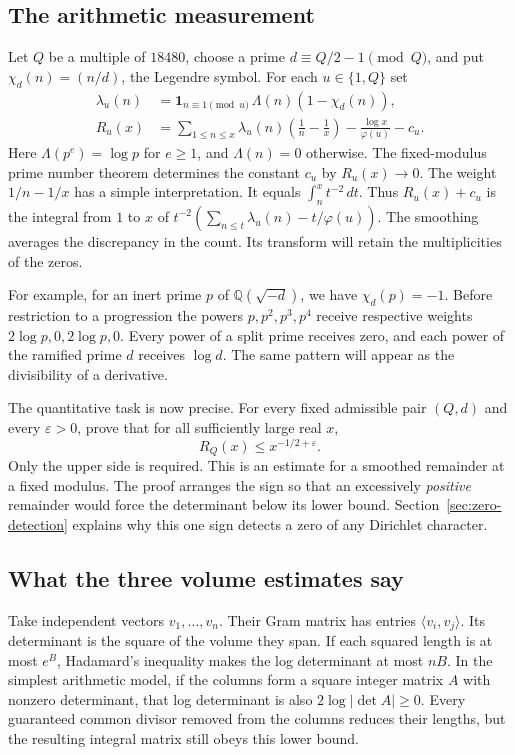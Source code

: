 \documentclass[11pt,letterpaper]{article}
\begin{document}
\subsection{The arithmetic measurement}
Let \(Q\) be a multiple of \(18480\), choose a prime \(d\equiv Q/2-1\pmod Q\), and put \(\chi_d(n)=(n/d)\), the Legendre symbol. For each \(u\in\{1,Q\}\) set
\begin{align}
 \lambda_u(n)&=\mathbf1_{n\equiv1\pmod u}\,\Lambda(n)(1-\chi_d(n)),\nonumber\\
 R_u(x)&=\sum_{1\le n\le x}\lambda_u(n)\left(\frac1n-\frac1x\right)
               -\frac{\log x}{\varphi(u)}-c_u. \label{eq:remainder}
\end{align}
Here \(\Lambda(p^e)=\log p\) for \(e\ge1\), and \(\Lambda(n)=0\) otherwise. The fixed-modulus prime number theorem determines the constant \(c_u\) by \(R_u(x)\to0\). The weight \(1/n-1/x\) has a simple interpretation. It equals \(\int_n^x t^{-2}\,dt\). Thus \(R_u(x)+c_u\) is the integral from \(1\) to \(x\) of
\(t^{-2}(\sum_{n\le t}\lambda_u(n)-t/\varphi(u))\). The smoothing averages the discrepancy in the count. Its transform will retain the multiplicities of the zeros.

For example, for an inert prime \(p\) of \(\mathbb Q(\sqrt{-d})\), we have \(\chi_d(p)=-1\). Before restriction to a progression the powers \(p,p^2,p^3,p^4\) receive respective weights \(2\log p,0,2\log p,0\). Every power of a split prime receives zero, and each power of the ramified prime \(d\) receives \(\log d\). The same pattern will appear as the divisibility of a derivative.

The quantitative task is now precise. For every fixed admissible pair \((Q,d)\) and every \(\varepsilon>0\), prove that for all sufficiently large real \(x\),
\begin{equation}
                  R_Q(x)\le x^{-1/2+\varepsilon}.\label{eq:oneside}
\end{equation}
Only the upper side is required. This is an estimate for a smoothed remainder at a fixed modulus. The proof arranges the sign so that an excessively \emph{positive} remainder would force the determinant below its lower bound. Section~\ref{sec:zero-detection} explains why this one sign detects a zero of any Dirichlet character.

\subsection{What the three volume estimates say}\label{sec:contract}
Take independent vectors \(v_1,\ldots,v_n\). Their Gram matrix has entries \(\langle v_i,v_j\rangle\). Its determinant is the square of the volume they span. If each squared length is at most \(e^B\), Hadamard's inequality makes the log determinant at most \(nB\). In the simplest arithmetic model, if the columns form a square integer matrix \(A\) with nonzero determinant, that log determinant is also \(2\log|\det A|\ge0\). Every guaranteed common divisor removed from the columns reduces their lengths, but the resulting integral matrix still obeys this lower bound.
\end{document}
